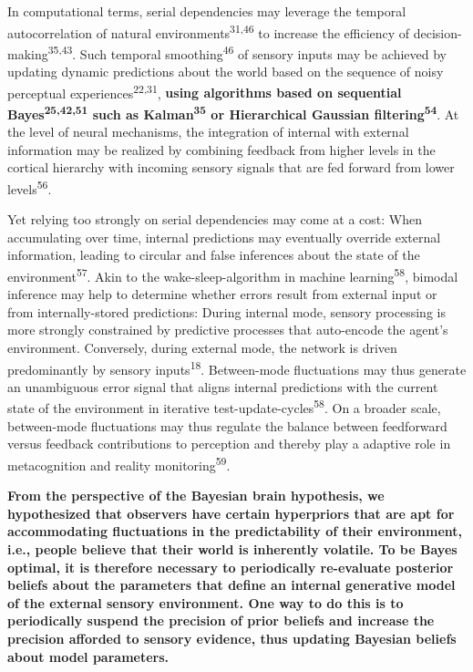 \documentclass[
]{article}
\begin{document}
In computational terms, serial dependencies may leverage the temporal
autocorrelation of natural environments\textsuperscript{31,46} to
increase the efficiency of decision-making\textsuperscript{35,43}. Such
temporal smoothing\textsuperscript{46} of sensory inputs may be achieved
by updating dynamic predictions about the world based on the sequence of
noisy perceptual experiences\textsuperscript{22,31}, \textbf{using
algorithms based on sequential Bayes\textsuperscript{25,42,51} such as
Kalman\textsuperscript{35} or Hierarchical Gaussian
filtering\textsuperscript{54}}. At the level of neural mechanisms, the
integration of internal with external information may be realized by
combining feedback from higher levels in the cortical hierarchy with
incoming sensory signals that are fed forward from lower
levels\textsuperscript{56}.

Yet relying too strongly on serial dependencies may come at a cost: When
accumulating over time, internal predictions may eventually override
external information, leading to circular and false inferences about the
state of the environment\textsuperscript{57}. Akin to the
wake-sleep-algorithm in machine learning\textsuperscript{58}, bimodal
inference may help to determine whether errors result from external
input or from internally-stored predictions: During internal mode,
sensory processing is more strongly constrained by predictive processes
that auto-encode the agent's environment. Conversely, during external
mode, the network is driven predominantly by sensory
inputs\textsuperscript{18}. Between-mode fluctuations may thus generate
an unambiguous error signal that aligns internal predictions with the
current state of the environment in iterative
test-update-cycles\textsuperscript{58}. On a broader scale, between-mode
fluctuations may thus regulate the balance between feedforward versus
feedback contributions to perception and thereby play a adaptive role in
metacognition and reality monitoring\textsuperscript{59}.

\textbf{From the perspective of the Bayesian brain hypothesis, we
hypothesized that observers have certain hyperpriors that are apt for
accommodating fluctuations in the predictability of their environment,
i.e., people believe that their world is inherently volatile. To be
Bayes optimal, it is therefore necessary to periodically re-evaluate
posterior beliefs about the parameters that define an internal
generative model of the external sensory environment. One way to do this
is to periodically suspend the precision of prior beliefs and increase
the precision afforded to sensory evidence, thus updating Bayesian
beliefs about model parameters.}
\end{document}
